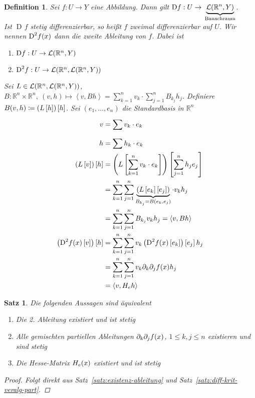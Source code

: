 \documentclass[11pt, twoside, a4paper]{article}
\theoremstyle{plain}
\newtheorem{definition}[blockelement]{Definition}
\newtheorem{satz}[blockelement]{Satz}
\numberwithin{equation}{subsection}
\newcommand{\pair}[1]{\left(#1\right)}
\newcommand{\of}[1]{\mathopen{}\mathclose{}\bgroup\left(#1\aftergroup\egroup\right)}
\newcommand{\interv}[1]{\left[#1\right]}
\newcommand{\sprod}[1]{\left<#1\right>}
\newcommand{\fromto}{\rightarrow{}}
\DeclareMathOperator{\D}{D\!}
\newcommand{\R}{\mathbb{R}}
\newcommand{\mL}{\mathcal{L}}
\begin{document}
    \begin{definition}
        Sei $f: U\fromto Y$ eine Abbildung. Dann gilt $\D f: U\fromto \underbrace{\mL\of{\R^n, Y}}_{\text{Banachraum}}$.\\
        Ist $\D f$ stetig differenzierbar, so heißt $f$ zweimal differenzierbar auf $U$. Wir nennen $\text{D}^2 f\of{x}$ dann die zweite Ableitung von $f$. Dabei ist
        \begin{enumerate}[label=(\roman*)]
            \item $\D f: U\fromto\mL\of{\R^n, Y}$
            \item $\text{D}^2 f: U\fromto \mL\of{\R^n, \mL\of{\R^n, Y}}$
        \end{enumerate}
        Sei $L\in\mL\of{\R^n, \mL\of{\R^n, Y}}$, $B: \R^n\times\R^n,~\pair{v,h}\mapsto \sprod{v, Bh} = \sum_{k=1}^n v_k\cdot \sum_{j=1}^n B_{k_j} h_j$. Definiere $B\of{v,h} \coloneqq \pair{L\interv{h}}\interv{h}$. Sei $\pair{e_1, \ldots, e_n}$ die Standardbasis in $\R^n$
        \begin{align*}
            v &= \sum_{}^{} v_k\cdot e_k\\
            h &= \sum h_k\cdot e_k\\
            \pair{L\interv{v}}\interv{h} &= \pair{L\interv{\sum_{k=1}^{n} v_k\cdot e_k}}\interv{\sum_{j=1}^{n} h_j e_j}\\
            &= \sum_{k=1}^{n} \sum_{j=1}^{n} \underbrace{\pair{L\interv{e_k}\interv{e_j}}}_{B_{k_j} = B\of{e_k, e_j}}\cdot v_k h_j\\
            &= \sum_{k=1}^{n} \sum_{j=1}^{n} B_{k_j} v_k h_j = \sprod{v, Bh}\\
            \pair{\text{D}^2 f\of{x}\interv{v}}\interv{h} &= \sum_{k=1}^{n} \sum_{j=1}^{n} v_k\pair{\text{D}^2 f\of{x}\interv{e_k}}\interv{e_j} h_j\\
            &= \sum_{k=1}^{n} \sum_{j=1}^{n} v_k \partial_k \partial_j f\of{x} h_j\\
            &= \sprod{v, H_e h}
        \end{align*}
    \end{definition}

    \begin{satz} %
        Die folgenden Aussagen sind äquivalent
        \begin{enumerate}[label=(\roman*)]
            \item Die 2. Ableitung existiert und ist stetig
            \item Alle gemischten partiellen Ableitungen $\partial_k\partial_j f\of{x}$, $1\leq k,j \leq n$ existieren und sind stetig
            \item Die Hesse-Matrix $H_e \of{x}$ existiert und ist stetig
        \end{enumerate}

        \begin{proof}
            Folgt direkt aus Satz~\ref{satz:existenz-ableitung} und Satz~\ref{satz:diff-krit-veralg-part}.
        \end{proof}
    \end{satz}
\end{document}
